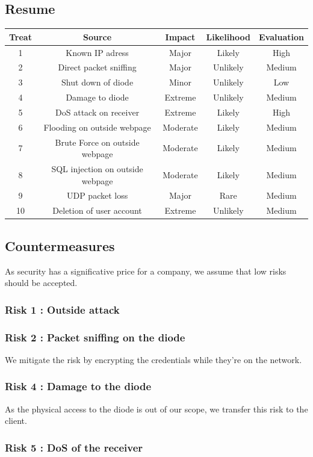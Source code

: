 \documentclass[a4paper,11pt]{article}
\begin{document}
\subsection{Resume}
\begin{tabular}{|c|c|c|c|c|}
\hline
Treat & Source & Impact& Likelihood & Evaluation \\
\hline
1 & Known IP adress & Major & Likely & High\\
\hline
2 &  Direct packet sniffing & Major & Unlikely & Medium\\
\hline
3 & Shut down of diode & Minor & Unlikely & Low \\
\hline
4 & Damage to diode & Extreme & Unlikely & Medium\\
\hline
5 & DoS attack on receiver & Extreme & Likely & High\\
\hline
6 & Flooding on outside webpage & Moderate & Likely & Medium \\
\hline 
7 &  Brute Force on outside webpage & Moderate & Likely & Medium\\
\hline
8 & SQL injection on outside webpage & Moderate & Likely & Medium \\
\hline
9& UDP packet loss & Major & Rare & Medium \\
\hline
10 & Deletion of user account & Extreme & Unlikely & Medium \\
\hline
  
\end{tabular}
\subsection{Countermeasures}
As security has a significative price for a company, we assume that low risks should be accepted.
\subsubsection{Risk 1 : Outside attack}
\subsubsection{Risk 2 : Packet sniffing on the diode}
We mitigate the risk by encrypting the credentials while they're on the network.
\subsubsection{Risk 4 : Damage to the diode}
As the physical access to the diode is out of our scope, we transfer this risk to the client.
\subsubsection{Risk 5 : DoS of the receiver}
\end{document}
